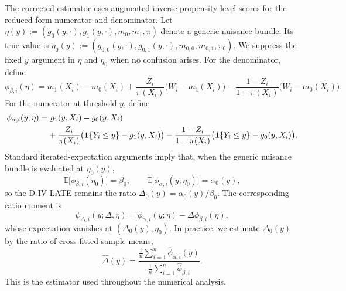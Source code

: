 \documentclass[final,3p,fleqn, 10pt]{elsarticle}
\begin{document}
The corrected estimator uses augmented inverse-propensity level scores for the reduced-form numerator and denominator. Let $\eta(y) := (g_0(y,\cdot), g_1(y,\cdot), m_0, m_1, \pi)$ denote a generic nuisance bundle. Its true value is $\eta_0(y):=(g_{0,0}(y,\cdot), g_{0,1}(y,\cdot), m_{0,0}, m_{0,1}, \pi_0)$. We suppress the fixed $y$ argument in $\eta$ and $\eta_0$ when no confusion arises. For the denominator, define
\begin{equation} \label{eq:psi_beta}
\phi_{\beta, i}(\eta) =
m_1(X_i) - m_0(X_i)
 + \frac{Z_i}{\pi(X_i)} \bigl(W_i - m_1(X_i)\bigr)
 - \frac{1-Z_i}{1-\pi(X_i)} \bigl(W_i - m_0(X_i)\bigr).
\end{equation}
For the numerator at threshold $y$, define
\begin{align} \label{eq:psi_alpha}
\phi_{\alpha, i}(y; \eta) = & \ g_1(y, X_i) - g_0(y, X_i) \nonumber \\
& + \frac{Z_i}{\pi(X_i)} \bigl(\mathbf{1}\{Y_i \le y\} - g_1(y, X_i)\bigr)
 - \frac{1-Z_i}{1-\pi(X_i)} \bigl(\mathbf{1}\{Y_i \le y\} - g_0(y, X_i)\bigr).
\end{align}
Standard iterated-expectation arguments imply that, when the generic nuisance bundle is evaluated at $\eta_0(y)$,
\[
\mathbb{E}\bigl[\phi_{\beta, i}(\eta_0)\bigr] = \beta_0,
\qquad
\mathbb{E}\bigl[\phi_{\alpha, i}(y; \eta_0)\bigr] = \alpha_0(y),
\]
so the D-IV-LATE remains the ratio $\Delta_0(y) = \alpha_0(y) / \beta_0$. The corresponding ratio moment is
\[
\psi_{\Delta, i}(y; \Delta, \eta) =
\phi_{\alpha, i}(y; \eta) - \Delta \phi_{\beta, i}(\eta),
\]
whose expectation vanishes at $(\Delta_0(y), \eta_0)$. In practice, we estimate $\Delta_0(y)$ by the ratio of cross-fitted sample means,
\begin{equation} \label{eq:moment_condition_ratio}
\hat{\Delta}(y) =
\frac{\frac{1}{n} \sum_{i=1}^{n} \hat{\phi}_{\alpha, i}(y)}
{\frac{1}{n} \sum_{i=1}^{n} \hat{\phi}_{\beta, i}}.
\end{equation}
This is the estimator used throughout the numerical analysis.
\end{document}
